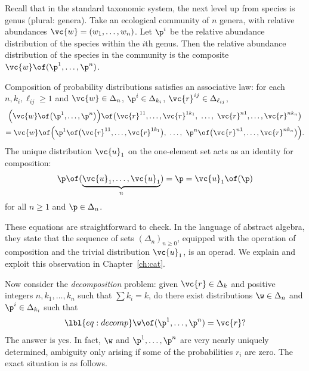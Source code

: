 \begin{example}
Recall that in the standard taxonomic system, the next
level up from species is genus (plural: genera).  Take an
ecological 
community of $n$ genera, with relative abundances $\vc{w} = (w_1, \ldots,
w_n)$.  Let $\p^i$ be the relative abundance distribution of the species
within the $i$th genus.  Then the relative abundance distribution of the
species in the community is the composite $\vc{w} \of (\p^1, \ldots,
\p^n)$.
\end{example}

\begin{remark}
Composition of probability distributions satisfies an associative%
% 
%
% 
law: for
each $n, k_i, \ell_{i j} \geq 1$ and $\vc{w} \in \Delta_n$, $\p^i \in
\Delta_{k_i}$, $\vc{r}^{i j} \in \Delta_{\ell_{i j}}$,
% 
\begin{multline*}
\Bigl( \vc{w} \of \bigl(\p^1, \ldots, \p^n\bigr) \Bigr) \of
\bigl(\vc{r}^{1 1}, \ldots, \vc{r}^{1 k_1}, 
\ \ldots, \ 
\vc{r}^{n 1}, \ldots, \vc{r}^{n k_n}\bigr)\\
=
\vc{w} \of \Bigl(
\p^1 \of \bigl(\vc{r}^{1 1}, \ldots, \vc{r}^{1 k_1}\bigr), \ \ldots, \ 
\p^n \of \bigl(\vc{r}^{n 1}, \ldots, \vc{r}^{n k_n}\bigr) 
\Bigr).
\end{multline*}
% 
The unique distribution $\vc{u}_1$ on the one-element set acts as an
identity for composition:
\[
\p \of (\underbrace{\vc{u}_1, \ldots, \vc{u}_1}_n)
=
\p
=
\vc{u}_1 \of (\p)
\]
for all $n \geq 1$ and $\p \in \Delta_n$.  

These equations are straightforward to check.  In the language of abstract
algebra, they state that the sequence of sets $(\Delta_n)_{n \geq 0}$,
equipped with the operation of composition and the trivial distribution
$\vc{u}_1$, is an operad.%
%
%
%
\index{operad!simplex}
% 
We explain and exploit this observation in Chapter~\ref{ch:cat}.
\end{remark}

Now consider the \emph{decomposition} problem: given
$\vc{r} \in \Delta_k$ and positive integers $n, k_1, \ldots, k_n$ such that
$\sum k_i = k$, do there exist distributions $\w \in \Delta_n$ and $\p^i
\in \Delta_{k_i}$ such that
% 
\begin{equation}
\lbl{eq:decomp}
\w \of (\p^1, \ldots, \p^n) = \vc{r}?
\end{equation}
% 
The answer is yes.  In fact, $\w$ and $\p^1, \ldots, \p^n$ are
very nearly uniquely determined, ambiguity only arising if
some of the probabilities $r_i$ are zero.  The exact
situation is as follows.

